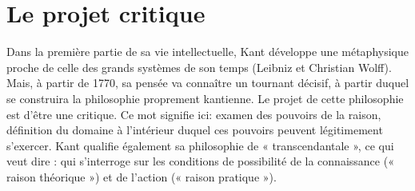 
\section{Le projet critique}

Dans la première partie de sa vie intellectuelle,
Kant développe une
métaphysique proche de celle des
grands systèmes de son temps (Leibniz
et Christian Wolff). Mais, à partir de
1770, sa pensée va connaître un tournant
décisif, à partir duquel se construira
la philosophie proprement kantienne. Le
projet de cette philosophie est d’être une
critique. Ce mot signifie ici: examen
des pouvoirs de la raison, définition du
domaine à l’intérieur duquel ces pouvoirs
peuvent légitimement s'exercer.
Kant qualifie également sa philosophie
de « transcendantale », ce qui veut dire :
qui s'interroge sur les conditions de possibilité
de la connaissance (« raison théorique »)
et de l'action (« raison pratique »).

